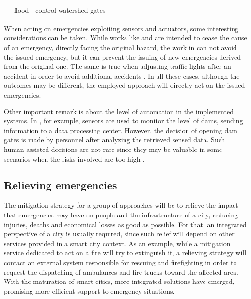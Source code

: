 \begin{refsection}
\begin{table}
\begin{tabular}{|c|c|c|}
        \hline
        \citeauthor{mitigationAct7} \cite{mitigationAct7} & flood       & control watershed gates \\

    \end{tabular}
\end{table}

When acting on emergencies exploiting sensors and actuators, some interesting considerations can be taken. While works like \cite{SultanMahmud2017} and \cite{mitigationAct1} are intended to cease the cause of an emergency, directly facing the original hazard, the work in \cite{iotEarthquake2} can not avoid the issued emergency, but it can prevent the issuing of new emergencies derived from the original one. The same is true when adjusting traffic lights after an accident in order to avoid additional accidents \cite{mitigationITS1,rego2018software}. In all these cases, although the outcomes may be different, the employed approach will directly act on the issued emergencies.

Other important remark is about the level of automation in the implemented systems. In \cite{iotFlood2}, for example, sensors are used to monitor the level of dams, sending information to a data processing center. However, the decision of opening dam gates is made by personnel after analyzing the retrieved sensed data. Such human-assisted decisions are not rare since they may be valuable in some scenarios when the risks involved are too high \cite{humanAssisted1}.

\subsection{Relieving emergencies}

The mitigation strategy for a group of approaches will be to relieve the impact that emergencies may have on people and the infrastructure of a city, reducing injuries, deaths and economical losses as good as possible. For that, an integrated perspective of a city is usually required, since such relief will depend on other services provided in a smart city context. As an example, while a mitigation service dedicated to act on a fire will try to extinguish it, a relieving strategy will contact an external system responsible for rescuing and firefighting in order to request the dispatching of ambulances and fire trucks toward the affected area. With the maturation of smart cities, more integrated solutions have emerged, promising more efficient support to emergency situations. 


\end{refsection}
